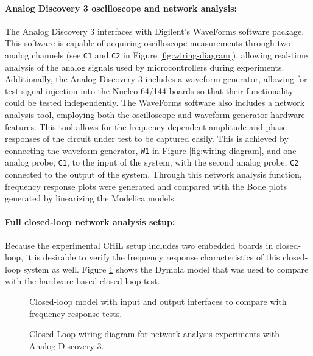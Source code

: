 \paragraph{Analog Discovery 3 oscilloscope and network analysis:} The Analog Discovery 3 interfaces with Digilent's WaveForms software package. This software is capable of acquiring oscilloscope measurements through two analog channels (see \texttt{C1} and \texttt{C2} in Figure \ref{fig:wiring-diagram}), allowing real-time analysis of the analog signals used by microcontrollers during experiments. Additionally, the Analog Discovery 3 includes a waveform generator, allowing for test signal injection into the Nucleo-64/144 boards so that their functionality could be tested independently. The WaveForms software also includes a network analysis tool, employing both the oscilloscope and waveform generator hardware features. This tool allows for the frequency dependent amplitude and phase responses of the circuit under test to be captured easily. This is achieved by connecting the waveform generator, \texttt{W1} in Figure \ref{fig:wiring-diagram}, and one analog probe, \texttt{C1}, to the input of the system, with the second analog probe, \texttt{C2} connected to the output of the system. Through this network analysis function, frequency response plots were generated and compared with the Bode plots generated by linearizing the Modelica models.

\paragraph{Full closed-loop network analysis setup:} Because the experimental CHiL setup includes two embedded boards in closed-loop, it is desirable to verify the frequency response characteristics of this closed-loop system as well. Figure \ref{fig:closed-loop-simulation} shows the Dymola model that was used to compare with the hardware-based closed-loop test.

\begin{figure}[t!]
    \centerline{}
    \caption{Closed-loop model with input and output interfaces to compare with frequency response tests.}
    \label{fig:closed-loop-simulation}
    \vspace{-1ex}
\end{figure}

\begin{figure}[t!]
    \centerline{}
    \vspace{-2ex}
    \caption{Closed-Loop wiring diagram for network analysis experiments with Analog Discovery 3.}
    \label{fig:closed-loop-wiring-diagram}
    \vspace{-2ex}
\end{figure}

